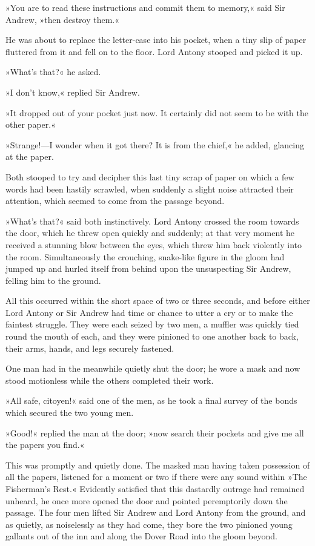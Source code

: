 »You are to read these instructions and commit them to memory,« said Sir Andrew, »then destroy them.«

He was about to replace the letter-case into his pocket, when a tiny slip of paper fluttered from it and fell on to the floor. Lord Antony stooped and picked it up.

»What's that?« he asked.

»I don't know,« replied Sir Andrew.

»It dropped out of your pocket just now. It certainly did not seem to be with the other paper.«

»Strange!—I wonder when it got there? It is from the chief,« he added, glancing at the paper.

Both stooped to try and decipher this last tiny scrap of paper on which a few words had been hastily scrawled, when suddenly a slight noise attracted their attention, which seemed to come from the passage beyond.

»What's that?« said both instinctively. Lord Antony crossed the room towards the door, which he threw open quickly and suddenly; at that very moment he received a stunning blow between the eyes, which threw him back violently into the room. Simultaneously the crouching, snake-like figure in the gloom had jumped up and hurled itself from behind upon the unsuspecting Sir Andrew, felling him to the ground.

All this occurred within the short space of two or three seconds, and before either Lord Antony or Sir Andrew had time or chance to utter a cry or to make the faintest struggle. They were each seized by two men, a muffler was quickly tied round the mouth of each, and they were pinioned to one another back to back, their arms, hands, and legs securely fastened.

One man had in the meanwhile quietly shut the door; he wore a mask and now stood motionless while the others completed their work.

»All safe, citoyen!« said one of the men, as he took a final survey of the bonds which secured the two young men.

»Good!« replied the man at the door; »now search their pockets and give me all the papers you find.«

This was promptly and quietly done. The masked man having taken possession of all the papers, listened for a moment or two if there were any sound within »The Fisherman's Rest.« Evidently satisfied that this dastardly outrage had remained unheard, he once more opened the door and pointed peremptorily down the passage. The four men lifted Sir Andrew and Lord Antony from the ground, and as quietly, as noiselessly as they had come, they bore the two pinioned young gallants out of the inn and along the Dover Road into the gloom beyond.

